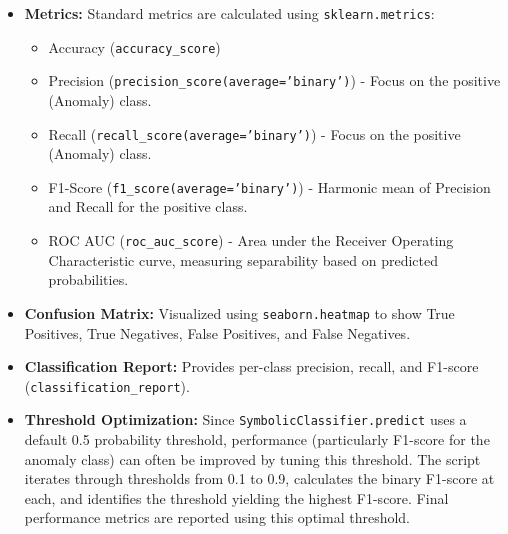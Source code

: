 \documentclass{article}
\begin{document}
\begin{itemize}
    \item \textbf{Metrics:} Standard metrics are calculated using \texttt{sklearn.metrics}:
        \begin{itemize}
            \item Accuracy (\texttt{accuracy\_score})
            \item Precision (\texttt{precision\_score(average='binary')}) - Focus on the positive (Anomaly) class.
            \item Recall (\texttt{recall\_score(average='binary')}) - Focus on the positive (Anomaly) class.
            \item F1-Score (\texttt{f1\_score(average='binary')}) - Harmonic mean of Precision and Recall for the positive class.
            \item ROC AUC (\texttt{roc\_auc\_score}) - Area under the Receiver Operating Characteristic curve, measuring separability based on predicted probabilities.
        \end{itemize}
    \item \textbf{Confusion Matrix:} Visualized using \texttt{seaborn.heatmap} to show True Positives, True Negatives, False Positives, and False Negatives.
    \item \textbf{Classification Report:} Provides per-class precision, recall, and F1-score (\texttt{classification\_report}).
    \item \textbf{Threshold Optimization:} Since \texttt{SymbolicClassifier.predict} uses a default 0.5 probability threshold, performance (particularly F1-score for the anomaly class) can often be improved by tuning this threshold. The script iterates through thresholds from 0.1 to 0.9, calculates the binary F1-score at each, and identifies the threshold yielding the highest F1-score. Final performance metrics are reported using this optimal threshold.
\end{itemize}
\end{document}
